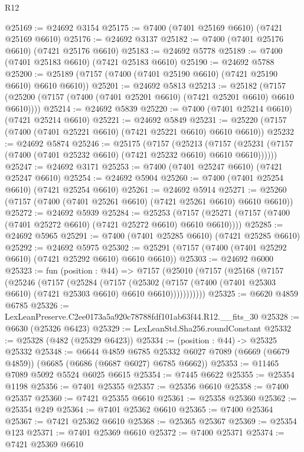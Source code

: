 \begin{lexlean}{R12}
\begin{coremodule}
@25169 := @24692 @3154
@25175 := @7400 (@7401 @25169 @6610) (@7421 @25169 @6610)
@25176 := @24692 @3137
@25182 := @7400 (@7401 @25176 @6610) (@7421 @25176 @6610)
@25183 := @24692 @5778
@25189 := @7400 (@7401 @25183 @6610) (@7421 @25183 @6610)
@25190 := @24692 @5788
@25200 := @25189 (@7157 (@7400 (@7401 @25190 @6610) (@7421 @25190 @6610) @6610 @6610))
@25201 := @24692 @5813
@25213 := @25182
    (@7157 (@25200 (@7157 (@7400 (@7401 @25201 @6610) (@7421 @25201 @6610) @6610 @6610))))
@25214 := @24692 @5839
@25220 := @7400 (@7401 @25214 @6610) (@7421 @25214 @6610)
@25221 := @24692 @5849
@25231 := @25220 (@7157 (@7400 (@7401 @25221 @6610) (@7421 @25221 @6610) @6610 @6610))
@25232 := @24692 @5874
@25246 := @25175
    (@7157
      (@25213
        (@7157 (@25231 (@7157 (@7400 (@7401 @25232 @6610) (@7421 @25232 @6610) @6610 @6610))))))
@25247 := @24692 @3171
@25253 := @7400 (@7401 @25247 @6610) (@7421 @25247 @6610)
@25254 := @24692 @5904
@25260 := @7400 (@7401 @25254 @6610) (@7421 @25254 @6610)
@25261 := @24692 @5914
@25271 := @25260 (@7157 (@7400 (@7401 @25261 @6610) (@7421 @25261 @6610) @6610 @6610))
@25272 := @24692 @5939
@25284 := @25253
    (@7157 (@25271 (@7157 (@7400 (@7401 @25272 @6610) (@7421 @25272 @6610) @6610 @6610))))
@25285 := @24692 @5965
@25291 := @7400 (@7401 @25285 @6610) (@7421 @25285 @6610)
@25292 := @24692 @5975
@25302 := @25291 (@7157 (@7400 (@7401 @25292 @6610) (@7421 @25292 @6610) @6610 @6610))
@25303 := @24692 @6000
@25323 := fun (position : @44) =>
  @7157
    (@25010
      (@7157
        (@25168
          (@7157
            (@25246
              (@7157
                (@25284
                  (@7157
                    (@25302
                      (@7157 (@7400 (@7401 @25303 @6610) (@7421 @25303 @6610) @6610 @6610)))))))))))
@25325 := @6620 @4859 @6785
@25326 := LexLeanPreserve.C2ee0173a5a920c78788fdf101ab63f44.R12.__fits_30
@25328 := @6630 (@25326 @6423)
@25329 := LexLeanStd.Sha256.roundConstant
@25332 := @25328 (@482 (@25329 @6423))
@25334 := (position : @44) -> @25325 @25332
@25348 := @6644
    @4859
    @6785
    @25332
    @6027
    @7089
    (@6669 (@6679 @4859))
    (@6685 (@6686 (@6687 @6027) @6785 @6662))
@25353 := @11465 @7089 @5092 @5524 @6025 @6615
@25354 := @7445 @6622
@25355 := @25354 @1198
@25356 := @7401 @25355
@25357 := @25356 @6610
@25358 := @7400 @25357
@25360 := @7421 @25355 @6610
@25361 := @25358 @25360
@25362 := @25354 @249
@25364 := @7401 @25362 @6610
@25365 := @7400 @25364
@25367 := @7421 @25362 @6610
@25368 := @25365 @25367
@25369 := @25354 @123
@25371 := @7401 @25369 @6610
@25372 := @7400 @25371
@25374 := @7421 @25369 @6610

\end{coremodule}
\end{lexlean}
